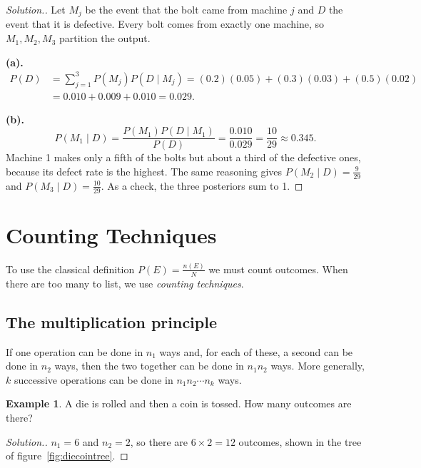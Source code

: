 \documentclass[12pt,a4paper]{report}
\theoremstyle{definition}
\newtheorem{example}[thm]{Example}
\theoremstyle{plain}
\theoremstyle{definition}
\newenvironment{solution}
  {\renewcommand{\qedsymbol}{}\begin{proof}[\textit{Solution}.]}
  {\end{proof}}
\begin{document}
\begin{solution}
Let $M_j$ be the event that the bolt came from machine $j$ and $D$ the event that it is
defective. Every bolt comes from exactly one machine, so $M_1, M_2, M_3$ partition the
output.

\textbf{(a).}
\begin{align*}
P(D) &= \sum_{j=1}^{3}P(M_j)P(D\mid M_j) = (0.2)(0.05)+(0.3)(0.03)+(0.5)(0.02)\\
&= 0.010+0.009+0.010 = 0.029.
\end{align*}

\textbf{(b).}
\[P(M_1\mid D) = \frac{P(M_1)P(D\mid M_1)}{P(D)} = \frac{0.010}{0.029} = \frac{10}{29}\approx 0.345.\]
Machine 1 makes only a fifth of the bolts but about a third of the defective ones, because
its defect rate is the highest. The same reasoning gives $P(M_2\mid D) = \frac{9}{29}$ and
$P(M_3\mid D) = \frac{10}{29}$. As a check, the three posteriors sum to 1.
\end{solution}

\section{Counting Techniques}

To use the classical definition $P(E) = \frac{n(E)}{N}$ we must count outcomes. When
there are too many to list, we use \emph{counting techniques}.

\subsection{The multiplication principle}

If one operation can be done in $n_1$ ways and, for each of these, a second can be done
in $n_2$ ways, then the two together can be done in $n_1n_2$ ways. More generally, $k$
successive operations can be done in $n_1n_2\cdots n_k$ ways.

\begin{example}
\label{ex:diecoin}
A die is rolled and then a coin is tossed. How many outcomes are there?
\end{example}

\begin{solution}
$n_1 = 6$ and $n_2 = 2$, so there are $6\times 2 = 12$ outcomes, shown in the tree of
figure~\ref{fig:diecointree}.
\end{solution}
\end{document}
